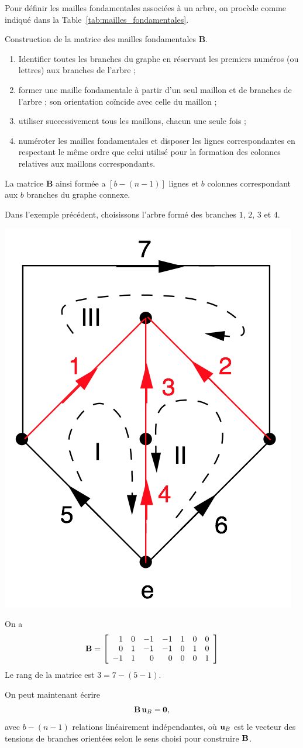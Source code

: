 Pour définir les mailles fondamentales associées à un arbre, on procède comme indiqué dans la Table~\ref{tab:mailles_fondamentales}.
\begin{table}[ht]
	\caption{Construction de la matrice des mailles fondamentales $\mathbf{B}$.\label{tab:mailles_fondamentales}}
\begin{boxedminipage}{\textwidth}
\begin{enumerate}
\item Identifier toutes les branches du graphe en réservant les premiers numéros (ou lettres) aux branches de l'arbre ;
\item former une maille fondamentale à partir d'un seul maillon et de branches de l'arbre ; son orientation coïncide avec celle du maillon ;
\item utiliser successivement tous les maillons, chacun une seule fois ;
\item numéroter les mailles fondamentales et disposer les lignes correspondantes en respectant le même ordre que celui utilisé pour la formation des colonnes relatives aux maillons correspondants.
\end{enumerate}
\end{boxedminipage}
\end{table}
La matrice $\mathbf{B}$ ainsi formée a $[b - (n - 1)]$ lignes et $b$ colonnes correspondant aux $b$ branches du graphe connexe.


\begin{testexample}
	Dans l'exemple précédent, choisissons l'arbre  formé des branches $1$, $2$, $3$ et $4$. 		
	\begin{center}
	\includegraphics[width=0.4\linewidth]{figs/methodes-generales/m_mailles_2}
	\end{center}
	On a 
	\[ {\bf B} = 
	\left[\begin{array}{rrrrrrr}
	1 & 0 & -1 & -1 & 1 & 0 & 0\\
	0&1 & -1& -1 & 0  & 1 & 0\\
	-1 & 1 & 0 & 0 & 0  &0 &1
	\end{array}\right] \]
	Le rang de la matrice est $3=7-(5-1)$.
\end{testexample}
On peut maintenant écrire $${\bf B}\, {\bf u}_B =  {\bf 0},$$
avec $b-(n-1)$ relations linéairement indépendantes, où
${\bf u}_B$ est le vecteur des tensions de branches orientées selon le sens choisi pour construire ${\bf B}$.

